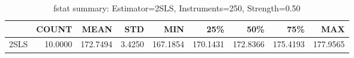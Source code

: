 \begin{table}[ht]
\centering
\caption{fstat summary: Estimator=2SLS, Instruments=250, Strength=0.50}
\begin{tabular}{lrrrrrrrr}
\toprule
 & COUNT & MEAN & STD & MIN & 25\% & 50\% & 75\% & MAX \\
\midrule
2SLS & 10.0000 & 172.7494 & 3.4250 & 167.1854 & 170.1431 & 172.8366 & 175.4193 & 177.9565 \\
\bottomrule
\end{tabular}
\end{table}

